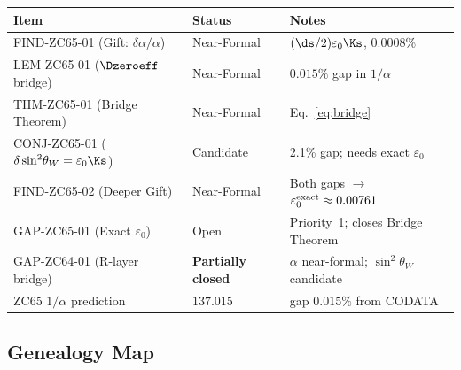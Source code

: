 \documentclass[12pt, a4paper]{article}
\renewcommand{\swsq}{\sin^2\!\theta_W}
\begin{document}
{\small
\begin{center}
\renewcommand{\arraystretch}{1.30}
\begin{tabular}{@{}p{4.2cm}p{2.5cm}p{6.8cm}@{}}
\toprule
\textbf{Item} & \textbf{Status} & \textbf{Notes} \\
\midrule
FIND-ZC65-01 (Gift: $\delta\alpha/\alpha$) & Near-Formal & $(\ds/2)\varepsilon_0\Ks$, 0.0008\% \\
LEM-ZC65-01 ($\Dzeroeff$ bridge) & Near-Formal & $0.015\%$ gap in $1/\alpha$ \\
THM-ZC65-01 (Bridge Theorem) & Near-Formal & Eq.~\eqref{eq:bridge} \\
CONJ-ZC65-01 ($\delta\swsq = \varepsilon_0\Ks$) & Candidate & 2.1\% gap; needs exact $\varepsilon_0$ \\
FIND-ZC65-02 (Deeper Gift) & Near-Formal & Both gaps $\to$ $\varepsilon_0^{\rm exact}\approx0.00761$ \\
GAP-ZC65-01 (Exact $\varepsilon_0$) & Open & Priority~1; closes Bridge Theorem \\
\midrule
GAP-ZC64-01 (R-layer bridge) & \textbf{Partially closed} & $\alpha$ near-formal; $\swsq$ candidate \\
ZC65 $1/\alpha$ prediction & $137.015$ & gap $0.015\%$ from CODATA \\
\bottomrule
\end{tabular}
\end{center}
}

\subsection{Genealogy Map}
\label{sec:genealogy}
\end{document}
